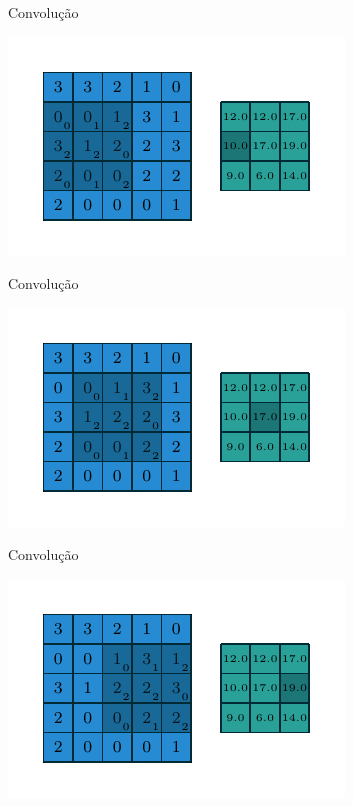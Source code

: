 \documentclass[10pt]{beamer}
\begin{document}
\begin{frame}{Convolução}
\begin{center}
\includegraphics[scale=1.5]{images/numerical_no_padding_no_strides_03.pdf}
\end{center}
\end{frame}

\begin{frame}{Convolução}
\begin{center}
\includegraphics[scale=1.5]{images/numerical_no_padding_no_strides_04.pdf}
\end{center}
\end{frame}

\begin{frame}{Convolução}
\begin{center}
\includegraphics[scale=1.5]{images/numerical_no_padding_no_strides_05.pdf}
\end{center}
\end{frame}
\end{document}
